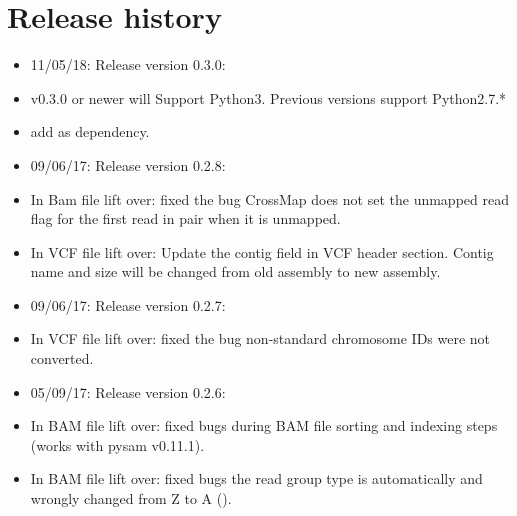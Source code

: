 \documentclass[letterpaper,10pt,english]{sphinxmanual}
\begin{document}
\chapter{Release history}
\label{\detokenize{index:release-history}}\begin{itemize}
\item {} 
11/05/18: Release version 0.3.0:

\end{itemize}
\begin{itemize}
\item {} 
v0.3.0 or newer will Support Python3. Previous versions support Python2.7.*

\item {} 
add  as dependency.

\end{itemize}
\begin{itemize}
\item {} 
09/06/17: Release version 0.2.8:

\end{itemize}
\begin{itemize}
\item {} 
In Bam file lift over: fixed the bug \sphinxquotedblleft{}CrossMap does not set the unmapped read flag for the first read in pair when it is unmapped\sphinxquotedblright{}.

\item {} 
In VCF file lift over: Update the \sphinxquotedblleft{}contig field\sphinxquotedblright{} in VCF header section. Contig name and size will be changed from old assembly to new assembly.

\end{itemize}
\begin{itemize}
\item {} 
09/06/17: Release version 0.2.7:

\end{itemize}
\begin{itemize}
\item {} 
In VCF file lift over: fixed the bug \sphinxquotedblleft{}non-standard chromosome IDs were not converted\sphinxquotedblright{}.

\end{itemize}
\begin{itemize}
\item {} 
05/09/17: Release version 0.2.6:

\end{itemize}
\begin{itemize}
\item {} 
In BAM file lift over: fixed bugs during BAM file sorting and indexing steps (works with pysam v0.11.1).

\item {} 
In BAM file lift over: fixed bugs \sphinxquotedblleft{}the read group type is automatically and wrongly changed from Z to A\sphinxquotedblright{} ().

\end{itemize}
\end{document}
